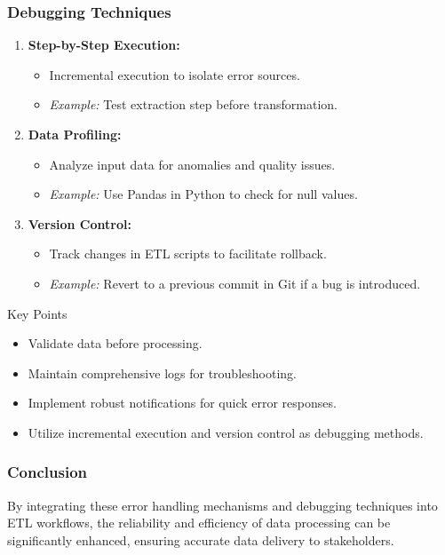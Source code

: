 \documentclass[aspectratio=169]{beamer}
\begin{document}
\begin{frame}[fragile]
    \frametitle{Debugging Techniques}
    \begin{enumerate}
        \item \textbf{Step-by-Step Execution:}
        \begin{itemize}
            \item Incremental execution to isolate error sources.
            \item \textit{Example:} Test extraction step before transformation.
        \end{itemize}
        
        \item \textbf{Data Profiling:}
        \begin{itemize}
            \item Analyze input data for anomalies and quality issues.
            \item \textit{Example:} Use Pandas in Python to check for null values.
        \end{itemize}

        \item \textbf{Version Control:}
        \begin{itemize}
            \item Track changes in ETL scripts to facilitate rollback.
            \item \textit{Example:} Revert to a previous commit in Git if a bug is introduced.
        \end{itemize}
    \end{enumerate}
    
    \begin{block}{Key Points}
        \begin{itemize}
            \item Validate data before processing.
            \item Maintain comprehensive logs for troubleshooting.
            \item Implement robust notifications for quick error responses.
            \item Utilize incremental execution and version control as debugging methods.
        \end{itemize}
    \end{block}
\end{frame}

\begin{frame}[fragile]
    \frametitle{Conclusion}
    By integrating these error handling mechanisms and debugging techniques into ETL workflows, the reliability and efficiency of data processing can be significantly enhanced, ensuring accurate data delivery to stakeholders.
\end{frame}
\end{document}
